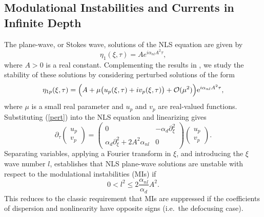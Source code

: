 \documentclass{JFM_Style/jfm}
\newcommand{\bp}{\begin{pmatrix}}
\newcommand{\ep}{\end{pmatrix}}
\newcommand{\pd}{\partial}
\begin{document}
\subsection{Modulational Instabilities and Currents in Infinite Depth}
The plane-wave, or Stokes wave, solutions of the NLS equation are given by
\begin{equation}
\eta_{1}(\xi,\tau) = A e^{i\alpha_{nl}A^{2}\tau},
\end{equation}
where $A>0$ is a real constant.  Complementing the results in \cite{thomas2012nonlinear}, we study the stability of these solutions by considering perturbed solutions of the form
\begin{equation}
\eta_{1p}(\xi,\tau) = \Big{(}A +\mu \big{(}u_{p}(\xi,\tau)+iv_{p}(\xi,\tau)\big{)} +\mathcal{O}(\mu^2)\Big{)}\mbox{e}^{i\alpha_{nl}A^{2}\tau},
\label{pert}
\end{equation}
where $\mu$ is a small real parameter and $u_{p}$ and $v_{p}$ are real-valued functions.  Substituting (\ref{pert}) into the NLS equation and linearizing gives 
\[
\pd_{\tau}\bp u_{p}\\ v_{p}\ep = \bp 0 & -\alpha_{d}\pd_{\xi}^{2} \\ \alpha_{d}\pd_{\xi}^{2} + 2A^{2}\alpha_{nl} & 0 \ep \bp u_{p} \\ v_{p} \ep.
\]
Separating variables, applying a Fourier transform in $\xi$, and introducing the $\xi$ wave number $l$, establishes that NLS plane-wave solutions are unstable with respect to the modulational instabilities (MIs) if
\[
0 < l^{2} \leq 2\frac{\alpha_{nl}}{\alpha_{d}}A^{2}.
\]
This reduces to the classic requirement that MIs are suppressed if the coefficients of dispersion and nonlinearity have opposite signs (i.e.~the defocusing case).  
\end{document}
